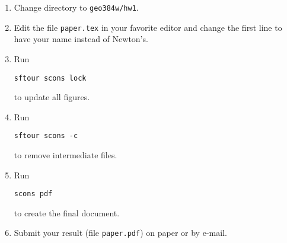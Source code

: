 \begin{enumerate}
\item Change directory to \verb#geo384w/hw1#.
\item Edit the file \texttt{paper.tex} in your favorite editor and change the
first line to have your name instead of Newton's.
\item Run
\begin{verbatim}
sftour scons lock
\end{verbatim}
to update all figures.
\item Run
\begin{verbatim}
sftour scons -c
\end{verbatim}
  to remove intermediate files.
\item Run
\begin{verbatim} 
scons pdf
\end{verbatim}
to create the final document.
\item Submit your result (file \texttt{paper.pdf}) on paper or by
  e-mail.
\end{enumerate}



